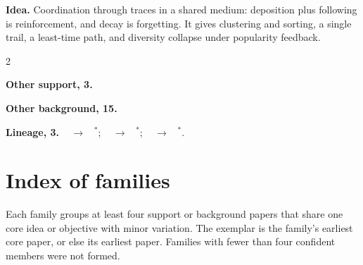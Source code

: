 \documentclass[10pt]{article}
\newcommand{\memb}[1]{\par\smallskip\textbf{#1}\quad}
\begin{document}
\textbf{Idea.} Coordination through traces in a shared medium: deposition plus following is reinforcement, and decay is forgetting. It gives clustering and sorting, a single trail, a least-time path, and diversity collapse under popularity feedback.

\begin{multicols}{2}
\memb{Other support, 3.} \citetext{\citealp{Grasse-reconstruction59}\dag; \citealp{Theraulaz-brief99}; \citealp{Krishnan-stigmergic26}}

\memb{Other background, 15.} {\footnotesize \citetext{\citealp{Deneubourg-dynamics91}; \citealp{Beckers-local94}\dag; \citealp{Dorigo-ant96}\dag; \citealp{Bonabeau-editor99}; \citealp{Bonabeau-swarm99}; \citealp{Holland-stigmergy99}; \citealp{Dorigo-ant00}; \citealp{Werfel-designing14}; \citealp{Heylighen-stigmergy16}; \citealp{Heylighen-stigmergy16b}; \citealp{Khuong-stigmergic16}; \citealp{Xu-stigmergic22}; \citealp{Kato-optimality24}; \citealp{Dunivin-recommender25}; \citealp{Pitteri-ant26}}}

\end{multicols}
\memb{Lineage, 3.} {\footnotesize \citeauthor{Grasse-reconstruction59}~\citeyear{Grasse-reconstruction59} $\to$ \citeauthor{Theraulaz-brief99}~\citeyear{Theraulaz-brief99}$^\ast$; \citeauthor{Deneubourg-dynamics91}~\citeyear{Deneubourg-dynamics91} $\to$ \citeauthor{Dorigo-ant96}~\citeyear{Dorigo-ant96}$^\ast$; \citeauthor{Theraulaz-brief99}~\citeyear{Theraulaz-brief99} $\to$ \citeauthor{Heylighen-stigmergy16}~\citeyear{Heylighen-stigmergy16}$^\ast$.}


\appendix
\section{Index of families}\label{app:families}
Each family groups at least four support or background papers that share one core idea or objective with minor variation. The exemplar is the family's earliest core paper, or else its earliest paper. Families with fewer than four confident members were not formed.
\end{document}
